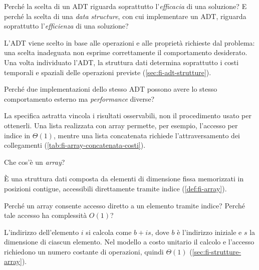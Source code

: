 \begin{exercise}
\label{ex:fi-esercizi-strutture-dati-scelta-adt-struttura}
Perché la scelta di un ADT riguarda soprattutto l'\emph{efficacia} di una
soluzione? E perché la scelta di una \emph{data structure}, con cui implementare
un ADT, riguarda soprattutto l'\emph{efficienza} di una soluzione?
\end{exercise}

L'ADT viene scelto in base alle operazioni e alle proprietà richieste dal
problema: una scelta inadeguata non esprime correttamente il comportamento
desiderato. Una volta individuato l'ADT, la struttura dati determina soprattutto
i costi temporali e spaziali delle operazioni previste
(\cref{sec:fi-adt-strutture}).

\begin{exercise}
\label{ex:fi-esercizi-strutture-dati-stesso-adt-prestazioni}
Perché due implementazioni dello stesso ADT possono avere lo stesso
comportamento esterno ma \emph{performance} diverse?
\end{exercise}

La specifica astratta vincola i risultati osservabili, non il procedimento usato
per ottenerli. Una lista realizzata con array permette, per esempio, l'accesso
per indice in \(\Theta(1)\), mentre una lista concatenata richiede
l'attraversamento dei collegamenti (\cref{tab:fi-array-concatenata-costi}).

\begin{exercise}
\label{ex:fi-esercizi-strutture-dati-definizione-array}
Che cos'è un \emph{array}?
\end{exercise}

È una struttura dati composta da elementi di dimensione fissa memorizzati in
posizioni contigue, accessibili direttamente tramite indice
(\cref{def:fi-array}).

\clearpage

\begin{exercise}
\label{ex:fi-esercizi-strutture-dati-array-accesso-diretto}
Perché un array consente accesso diretto a un elemento tramite indice? Perché
tale accesso ha complessità \(O(1)\)?
\end{exercise}

L'indirizzo dell'elemento \(i\) si calcola come \(b+is\), dove \(b\) è
l'indirizzo iniziale e \(s\) la dimensione di ciascun elemento. Nel modello a
costo unitario il calcolo e l'accesso richiedono un numero costante di
operazioni, quindi \(\Theta(1)\) (\cref{sec:fi-strutture-array}).

